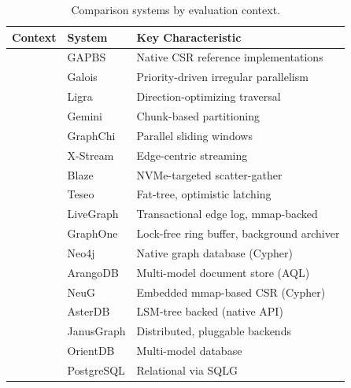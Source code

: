 \begin{table}[t]
  \centering
  \begin{tabular*}{\columnwidth}{@{\extracolsep{\fill}}lll@{}}
    \toprule
    Context & System & Key Characteristic \\
    \midrule
    & GAPBS   & Native CSR reference implementations \\
    & Galois  & Priority-driven irregular parallelism \\
    & Ligra   & Direction-optimizing traversal \\
    & Gemini  & Chunk-based partitioning \\
    \midrule
    & GraphChi  & Parallel sliding windows \\
    & X-Stream  & Edge-centric streaming \\
    & Blaze     & NVMe-targeted scatter-gather \\
    \midrule
    & Teseo     & Fat-tree, optimistic latching \\
    & LiveGraph & Transactional edge log, mmap-backed \\
    & GraphOne  & Lock-free ring buffer, background archiver \\
    \midrule
    & Neo4j      & Native graph database (Cypher) \\
    & ArangoDB   & Multi-model document store (AQL) \\
    & NeuG       & Embedded mmap-based CSR (Cypher) \\
    & AsterDB    & LSM-tree backed (native API) \\
    & JanusGraph & Distributed, pluggable backends \\
    & OrientDB   & Multi-model database \\
    & PostgreSQL & Relational via SQLG \\
    \bottomrule
  \end{tabular*}
  \caption{Comparison systems by evaluation context.}
  \label{tab:comparison-systems}
\end{table}

